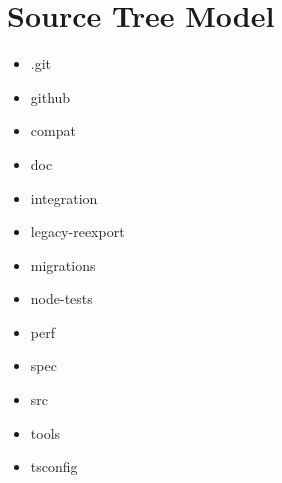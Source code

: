 \section{Source Tree Model}


\begin{itemize}
  \item .git
  \item github
  \item compat
  \item doc
  \item integration
  \item legacy-reexport
  \item migrations
  \item node-tests
  \item perf
  \item spec
  \item src
  \item tools
  \item tsconfig
\end{itemize}


